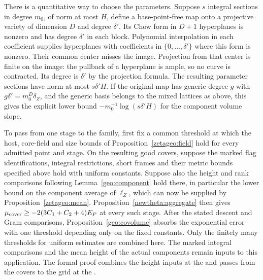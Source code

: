 There is a quantitative way to choose the parameters. Suppose \(s\)
integral sections in degree \(m_0\), of norm at most \(H\), define
a base-point-free map onto a projective variety of dimension \(D\)
and degree \(\delta'\). Its Chow form in \(D+1\) hyperplanes is
nonzero and has degree \(\delta'\) in each block. Polynomial
interpolation in each coefficient supplies hyperplanes with
coefficients in \(\{0,\ldots,\delta'\}\) where this form is nonzero.
Their common center misses the image. Projection from that center
is finite on the image: the pullback of a hyperplane is ample, so
no curve is contracted. Its degree is \(\delta'\) by the projection
formula. The resulting parameter sections have norm at most
\(s\delta'H\). If the original map has generic degree \(g\) with
\(g\delta'=m_0^D\delta_Z\), and the generic basis belongs to the
mixed lattices as above, this gives the explicit lower bound
\(-m_0^{-1}\log(s\delta'H)\) for the component volume slope.

To pass from one stage to the family, first fix a common threshold
at which the host, core-field and size bounds of
Proposition~\ref{zetageo:field} hold for every admitted point and
stage. On the resulting good covers, suppose the marked flag
identifications, integral restrictions, short frames and their
metric bounds specified above hold with uniform constants. Suppose
also the height and rank comparisons following Lemma~\ref{geo:component}
hold there, in particular the lower bound on the component average
of \(\ell_Z\), which can now be supplied by
Proposition~\ref{zetageo:mean}. Proposition~\ref{newtheta:aggregate} then gives
\(\mu_{\rm cover}\ge-2(3C_1+C_2+4)E_P\) at every such stage.
After the stated descent and Gram comparisons,
Proposition~\ref{geo:covolume} absorbs the exponential error with
one threshold depending only on the fixed constants. Only the
finitely many thresholds for uniform estimates are combined here.
The marked integral comparisons and the mean height of the actual
components remain inputs to this application. The formal proof
combines the height inputs at the
and passes from the covers to the grid at the
.
